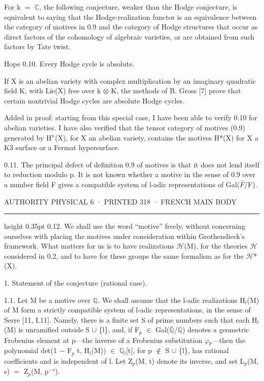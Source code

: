\documentclass[10pt,twoside]{article}
\newcommand{\PageUnit}[3]{%
  \par\noindent\hypertarget{record-#1}{}%
  \pdfbookmark[1]{Authority page #1 · printed #2}{bookmark-#1}%
  {\sffamily\footnotesize\color{D030Muted}AUTHORITY PHYSICAL #1 · PRINTED #2 · #3}%
  \par\vspace{0.35em}\hrule height 0.35pt\vspace{0.8em}}
\begin{document}
For k \ensuremath{=} \ensuremath{ℂ}, the following conjecture, weaker than the Hodge conjecture, is equivalent to saying that the Hodge-realization functor is an equivalence between the category of motives in 0.9 and the category of Hodge structures that occur as direct factors of the cohomology of algebraic varieties, or are obtained from such factors by Tate twist.\par
Hope 0.10. Every Hodge cycle is absolute.\par
If X is an abelian variety with complex multiplication by an imaginary quadratic field K, with Lie(X) free over k \ensuremath{⊗} K, the methods of B. Gross [7] prove that certain nontrivial Hodge cycles are absolute Hodge cycles.\par
Added in proof: starting from this special case, I have been able to verify 0.10 for abelian varieties. I have also verified that the tensor category of motives (0.9) generated by H\ensuremath{^{n}}(X), for X an abelian variety, contains the motives H*(X) for X a K3 surface or a Fermat hypersurface.\par
0.11. The principal defect of definition 0.9 of motives is that it does not lend itself to reduction modulo p. It is not known whether a motive in the sense of 0.9 over a number field F gives a compatible system of l-adic representations of Gal(\ensuremath{\bar{F}}/F).\par
\clearpage
\PageUnit{6}{318}{FRENCH MAIN BODY}
0.12. We shall use the word “motive” freely, without concerning ourselves with placing the motives under consideration within Grothendieck’s framework. What matters for us is to have realizations \ensuremath{ℋ}(M), for the theories \ensuremath{ℋ} considered in 0.2, and to have for these groups the same formalism as for the \ensuremath{ℋ}*(X).\par
1. Statement of the conjecture (rational case).\par
1.1. Let M be a motive over \ensuremath{ℚ}. We shall assume that the l-adic realizations H\ensuremath{_{l}}(M) of M form a strictly compatible system of l-adic representations, in the sense of Serre [11, I.11]. Namely, there is a finite set S of prime numbers such that each H\ensuremath{_{l}}(M) is unramified outside S \ensuremath{∪} \{l\}, and, if F\ensuremath{_{p}} \ensuremath{∈} Gal(\ensuremath{\bar{ℚ}}/\ensuremath{ℚ}) denotes a geometric Frobenius element at p—the inverse of a Frobenius substitution \ensuremath{φ}\ensuremath{_{p}}—then the polynomial det(1 \ensuremath{−} F\ensuremath{_{p}} t, H\ensuremath{_{l}}(M)) \ensuremath{∈} \ensuremath{ℚ}\ensuremath{_{l}}[t], for p \ensuremath{∉} S \ensuremath{∪} \{l\}, has rational coefficients and is independent of l. Let Z\ensuremath{_{p}}(M, t) denote its inverse, and set L\ensuremath{_{p}}(M, s) \ensuremath{=} Z\ensuremath{_{p}}(M, p\ensuremath{^{−s}}).\par
\end{document}
